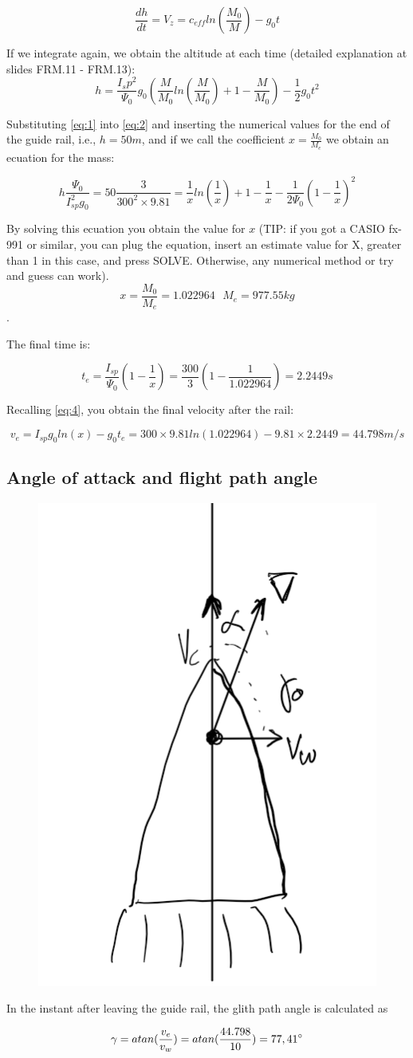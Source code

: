 \begin{equation}
\frac{dh}{dt} = V_z =  c_{eff} ln(\frac{M_0}{M}) - g_0 t
\label{eq:4}
\end{equation}

If we integrate again, we obtain the altitude at each time (detailed explanation at slides FRM.11 - FRM.13):
\begin{equation}
h= \frac{I_sp^2}{\Psi_0} g_0 \left( \frac{M}{M_0}ln(\frac{M}{M_0}) + 1 - \frac{M}{M_0} \right) - \frac{1}{2}g_0 t^2 
\label{eq:2}
\end{equation}

Substituting \autoref{eq:1} into \autoref{eq:2} and inserting the numerical values for the end of the guide rail, i.e., $h=50m$, and if we call the coefficient $ x = \frac{M_0}{M_e} $  we obtain an ecuation for the mass:

\begin{equation}
h \frac{\Psi_0}{I_{sp}^2g_0}=50 \frac{3}{300^2\times 9.81} = \frac{1}{x}ln(\frac{1}{x}) + 1 - \frac{1}{x} - \frac{1}{2\Psi_0}\left(1-\frac{1}{x}\right)^2
\label{eq:3}
\end{equation}

By solving this ecuation you obtain the value for $x$ (TIP: if you got a CASIO fx-991 or similar, you can plug the equation, insert an estimate value for X, greater than 1 in this case, and press SOLVE. Otherwise, any numerical method or try and guess can work). 
$$x = \frac{M_0}{M_e} = 1.022964 \ \ \ M_e = 977.55 kg$$. 

The final time is: 

\begin{equation}
	t_e = \frac{I_{sp}}{\Psi_0}\left(1-\frac{1}{x}\right) = \frac{300}{3}\left(1-\frac{1}{ 1.022964}\right) =2.2449 s 
\end{equation}

Recalling \autoref{eq:4}, you obtain the final velocity after the rail: 

\begin{equation}
	v_e = I_{sp}g_0 ln(x) -g_0 t_e = 300\times 9.81 ln(1.022964) - 9.81\times 2.2449 = 44.798 m/s
\end{equation}

\subsection{Angle of attack and flight path angle}


\begin{figure}[H]
	\centering
	\includegraphics[width=0.3\linewidth]{pics/screenshot002}
	\caption{}
	\label{fig:screenshot002}
\end{figure}

In the instant after leaving the guide rail, the glith path angle is calculated as 

\begin{equation}
	\gamma = atan(\frac{v_e}{v_w}) = atan(\frac{44.798}{10}) = 77,41 \degree
\end{equation}